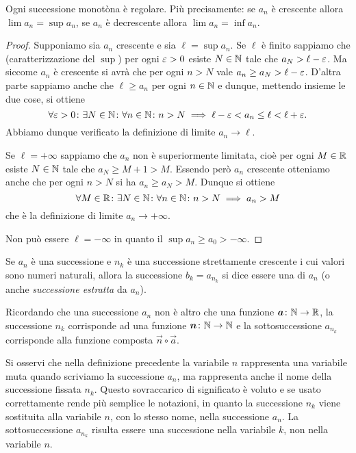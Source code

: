 \begin{theorem}
\mymark{***}
Ogni successione monotòna è regolare.
Più precisamente: se $a_n$ è crescente allora $\lim a_n = \sup a_n$,
se $a_n$ è decrescente allora $\lim a_n = \inf a_n$.
\end{theorem}
%
\begin{proof}
\mymark{***}
Supponiamo sia $a_n$ crescente e sia $\ell = \sup a_n$.
Se $\ell$ è finito sappiamo che (caratterizzazione del $\sup$)
per ogni $\varepsilon>0$ esiste $N\in \mathbb N$ tale che $a_N> \ell -\varepsilon$.
Ma siccome $a_n$ è crescente si avrà che per ogni $n>N$ vale
$a_n \ge a_N > \ell-\varepsilon$.
D'altra parte sappiamo anche che $\ell\ge a_n$ per ogni $n\in \mathbb N$
e dunque, mettendo insieme le due cose, si ottiene
\[
  \forall \varepsilon>0 \colon \exists N\in \mathbb N \colon \forall n\in \mathbb N\colon
   n>N \implies \ell-\varepsilon < a_n \le \ell < \ell + \varepsilon.
\]
Abbiamo dunque verificato la definizione di limite $a_n \to \ell$.

Se  $\ell=+\infty$ sappiamo che $a_n$ non è superiormente limitata, cioè per ogni $M\in \mathbb R$ esiste $N\in \mathbb N$ tale che $a_N \ge M+1 > M$.
Essendo però $a_n$ crescente otteniamo anche che per ogni $n>N$ si
 ha $a_n \ge a_N > M$. Dunque si ottiene
 \[
 \forall M\in \mathbb R\colon\exists N\in \mathbb N\colon \forall n \in \mathbb N\colon
  n>N \implies a_n > M
 \]
 che è la definizione di limite $a_n \to +\infty$.

Non può essere $\ell = -\infty$ in quanto il $\sup a_n \ge a_0 > -\infty$.
\end{proof}

\begin{definition}[sottosuccessione]
\mymark{*}
Se $a_n$ è una successione e $n_k$ è una successione strettamente crescente i cui valori sono numeri naturali, allora la successione
$b_k = a_{n_k}$ si dice essere una  di $a_n$
(o anche \emph{successione estratta} da $a_n$).
\end{definition}

Ricordando che una successione $a_n$ non è altro che una funzione
$\boldsymbol a\colon \mathbb N \to \mathbb R$, la successione $n_k$ corrisponde ad una funzione
$\boldsymbol n\colon \mathbb N \to \mathbb N$ e la sottosuccessione $a_{n_k}$ corrisponde alla
funzione composta $\vec n \circ \vec a$.

Si osservi che nella definizione precedente la variabile $n$ rappresenta
una variabile muta quando scriviamo la successione $a_n$, ma
rappresenta anche il nome della successione fissata $n_k$.
Questo sovraccarico
di significato è voluto e se usato correttamente rende più semplice
le notazioni, in quanto la successione $n_k$ viene sostituita alla
variabile $n$, con lo stesso nome, nella successione $a_n$.
La sottosuccessione $a_{n_k}$ risulta essere una successione nella variabile $k$, non nella variabile $n$.

